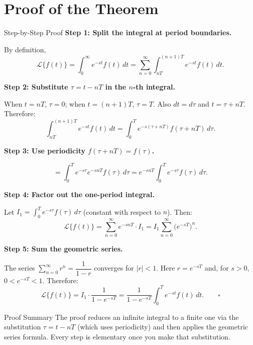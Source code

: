 \documentclass[12pt,a4paper]{article}
\begin{document}
\section{Proof of the Theorem}

\begin{infobox}{Step-by-Step Proof}
\textbf{Step 1: Split the integral at period boundaries.}

By definition,
\[
  \mathcal{L}\{f(t)\} = \int_0^\infty e^{-st} f(t)\,dt
  = \sum_{n=0}^{\infty} \int_{nT}^{(n+1)T} e^{-st} f(t)\,dt.
\]

\textbf{Step 2: Substitute $\tau = t - nT$ in the $n$-th integral.}

When $t = nT$, $\tau = 0$; when $t = (n+1)T$, $\tau = T$. Also $dt = d\tau$
and $t = \tau + nT$. Therefore:
\[
  \int_{nT}^{(n+1)T} e^{-st} f(t)\,dt
  = \int_0^T e^{-s(\tau+nT)} f(\tau + nT)\,d\tau.
\]

\textbf{Step 3: Use periodicity $f(\tau + nT) = f(\tau)$.}

\[
  = \int_0^T e^{-s\tau} e^{-snT} f(\tau)\,d\tau
  = e^{-snT} \int_0^T e^{-s\tau} f(\tau)\,d\tau.
\]

\textbf{Step 4: Factor out the one-period integral.}

Let $I_1 = \displaystyle\int_0^T e^{-s\tau} f(\tau)\,d\tau$ (constant with
respect to $n$). Then:
\[
  \mathcal{L}\{f(t)\}
  = \sum_{n=0}^{\infty} e^{-snT} \cdot I_1
  = I_1 \sum_{n=0}^{\infty} \bigl(e^{-sT}\bigr)^n.
\]

\textbf{Step 5: Sum the geometric series.}

The series $\displaystyle\sum_{n=0}^{\infty} r^n = \dfrac{1}{1-r}$ converges
for $|r| < 1$. Here $r = e^{-sT}$ and, for $s > 0$, $0 < e^{-sT} < 1$.
Therefore:
\[
  \mathcal{L}\{f(t)\}
  = I_1 \cdot \frac{1}{1 - e^{-sT}}
  = \frac{1}{1 - e^{-sT}} \int_0^T e^{-st} f(t)\,dt. \qquad \square
\]
\end{infobox}

\begin{learnbox}{Proof Summary}
The proof reduces an infinite integral to a finite one via the substitution
$\tau = t - nT$ (which uses periodicity) and then applies the geometric series
formula. Every step is elementary once you make that substitution.
\end{learnbox}

\end{document}
